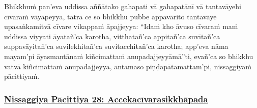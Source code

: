 Bhikkhuṁ pan'eva uddissa aññātako gahapati vā gahapatānī vā tantavāyehi cīvaraṁ vāyāpeyya, tatra ce so bhikkhu pubbe appavārito tantavāye upasaṅkamitvā cīvare vikappaṁ āpajjeyya: ``Idaṁ kho āvuso cīvaraṁ maṁ uddissa viyyati\makeatletter\hyperlink{endnote209-appendix}\makeatother{} āyatañ'ca karotha, vitthatañ'ca \mbox{appitañ'ca}\makeatletter\hyperlink{endnote210-appendix}\makeatother{} suvītañ'ca\makeatletter\hyperlink{endnote211-appendix}\makeatother{} suppavāyitañ'ca\makeatletter\hyperlink{endnote212-appendix}\makeatother{} suvilekhitañ'ca\makeatletter\hyperlink{endnote213-appendix}\makeatother{} suvitacchitañ'ca karotha; app'eva nāma mayam'pi\makeatletter\hyperlink{endnote214-appendix}\makeatother{} āyasmantānaṁ kiñcimattaṁ anupadajjeyyāmā''ti, evañ'ca so bhikkhu vatvā kiñcimattaṁ anupadajjeyya, antamaso piṇḍapātamattam'pi, nissaggiyaṁ pācittiyaṁ.



\subsubsection*{\hyperref[forf-exp28]{Nissaggiya Pācittiya 28: Accekacīvarasikkhāpada}}
\label{np28}

